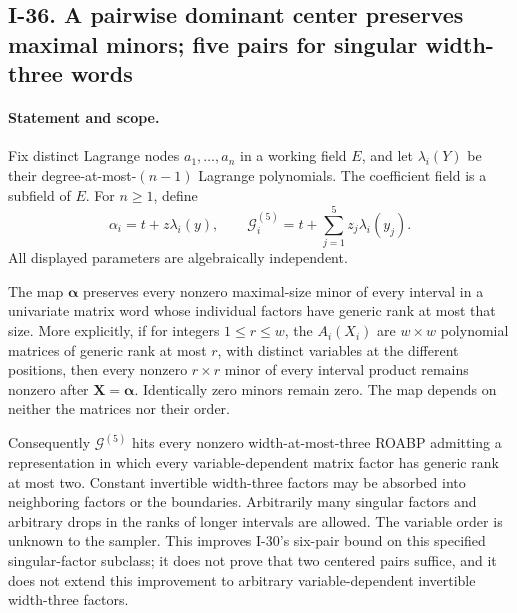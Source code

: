 \subsection{I-36. A pairwise dominant center preserves maximal minors; five pairs for singular width-three words}
\label{I-36}

\paragraph{Statement and scope.}
Fix distinct Lagrange nodes $a_1,\ldots,a_n$ in a working field
$E$, and let $\lambda_i(Y)$ be their degree-at-most-$(n-1)$
Lagrange polynomials. The coefficient field is a subfield of $E$.
For $n\ge1$, define
\[
 \alpha_i=t+z\lambda_i(y),\qquad
 \mathcal G_i^{(5)}=t+\sum_{j=1}^{5}z_j\lambda_i(y_j).
 \tag{I.84}
\]
All displayed parameters are algebraically independent.

The map $\boldsymbol\alpha$ preserves every nonzero maximal-size
minor of every interval in a univariate matrix word whose individual
factors have generic rank at most that size. More explicitly, if
for integers $1\le r\le w$, the $A_i(X_i)$ are $w\times w$
polynomial matrices of generic rank at
most $r$, with distinct variables at the different positions, then
every nonzero $r\times r$ minor of every interval product remains
nonzero after $\mathbf X=\boldsymbol\alpha$. Identically zero minors
remain zero. The map depends on neither the matrices nor their order.

Consequently $\mathcal G^{(5)}$ hits every nonzero width-at-most-three
ROABP admitting a representation in which every variable-dependent
matrix factor has generic rank at most two. Constant invertible
width-three factors may be absorbed into neighboring factors or
the boundaries. Arbitrarily many singular factors and arbitrary
drops in the ranks of longer intervals are allowed. The variable
order is unknown to the sampler. This improves I-30's six-pair bound
on this specified singular-factor subclass; it does not prove that
two centered pairs suffice, and it does not extend this improvement
to arbitrary variable-dependent invertible width-three factors.

